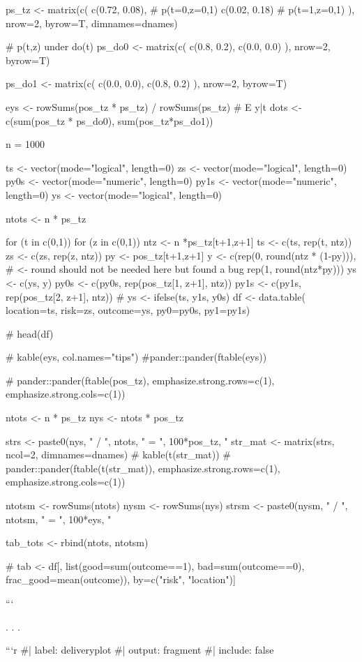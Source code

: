 ps_tz <- matrix(c(
  c(0.72, 0.08), # p(t=0,z=0,1)
  c(0.02, 0.18)  # p(t=1,z=0,1)
), nrow=2, byrow=T, dimnames=dnames)

# p(t,z) under do(t)
ps_do0 <- matrix(c( 
  c(0.8, 0.2), 
  c(0.0, 0.0)  
), nrow=2, byrow=T)

ps_do1 <- matrix(c( 
  c(0.0, 0.0), 
  c(0.8, 0.2) 
), nrow=2, byrow=T)


eys  <- rowSums(pos_tz * ps_tz) / rowSums(ps_tz) # E y|t
dots <- c(sum(pos_tz * ps_do0), sum(pos_tz*ps_do1))

n = 1000

ts  <- vector(mode="logical", length=0)
zs  <- vector(mode="logical", length=0)
py0s <- vector(mode="numeric", length=0)
py1s <- vector(mode="numeric", length=0)
ys  <- vector(mode="logical", length=0)

ntots <- n * ps_tz

for (t in c(0,1)) {
  for (z in c(0,1)) {
    ntz <- n *ps_tz[t+1,z+1]
    ts  <- c(ts, rep(t, ntz))
    zs  <- c(zs, rep(z, ntz))
    py <- pos_tz[t+1,z+1]
    y <- c(rep(0,
               round(ntz * (1-py))), # <- round should not be needed here but found a bug
           rep(1,
               round(ntz*py))) 
    ys <- c(ys, y)
    py0s <- c(py0s, rep(pos_tz[1, z+1], ntz))
    py1s <- c(py1s, rep(pos_tz[2, z+1], ntz))
  }
}
# ys <- ifelse(ts, y1s, y0s)
df <- data.table(
  location=ts,
  risk=zs,
  outcome=ys,
  py0=py0s,
  py1=py1s)

# head(df)

# kable(eys, col.names="tips")
#pander::pander(ftable(eys))

# pander::pander(ftable(pos_tz), emphasize.strong.rows=c(1), emphasize.strong.cols=c(1))

ntots <- n * ps_tz
nys <- ntots * pos_tz

strs <- paste0(nys, " / ", ntots, " = ", 100*pos_tz, "%
str_mat <- matrix(strs, ncol=2, dimnames=dnames)
# kable(t(str_mat))
# pander::pander(ftable(t(str_mat)), emphasize.strong.rows=c(1), emphasize.strong.cols=c(1))

ntotsm <- rowSums(ntots)
nysm <- rowSums(nys)
strsm <- paste0(nysm, " / ", ntotsm, " = ", 100*eys, "%

tab_tots <- rbind(ntots, ntotsm)


# tab <- df[, list(good=sum(outcome==1), bad=sum(outcome==0), frac_good=mean(outcome)), by=c("risk", "location")]


```

. . . 


```{r}
#| label: deliveryplot
#| output: fragment
#| include: false


